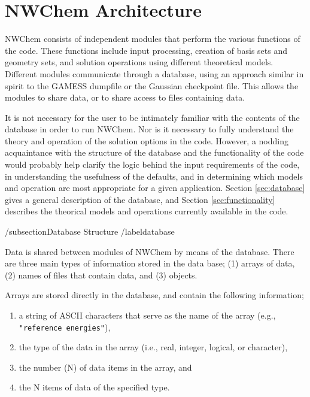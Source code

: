 \section{NWChem Architecture}
\label{sec:arch}

NWChem consists of independent modules that perform the various functions
of the code.  These functions include input processing, creation of basis
sets and geometry sets, and solution operations using different theoretical
models.  Different modules communicate through a database, using an approach
similar in spirit to the GAMESS dumpfile or the Gaussian checkpoint file.  
This allows the modules to share data, or to share access to files containing
data.

It is not necessary for the user to be intimately familiar with the contents
of the database in order to run NWChem.  Nor is it necessary to fully
understand the theory and operation of the solution options in the code.
However, a nodding acquaintance with the structure of the database and 
the functionality of the code would probably help clarify the logic behind
the input requirements of the code, in understanding the usefulness of the
defaults, and in determining which models and operation are most appropriate
for a given application.  Section \ref{sec:database} gives a general 
description of the database, and Section \ref{sec:functionality} describes 
the theorical models and operations currently available in the code.

/subsection{Database Structure}
/label{database}

Data is shared between modules of NWChem by means of the database.  There
are three main types of information stored in the data base; (1) arrays of
data, (2) names of files that contain data, and (3) objects.  

Arrays are stored directly in the database, and contain the following
information;

\begin{enumerate}
\item a string of ASCII characters that serve as the name of the array (e.g., 
      \verb+"reference energies"+),
\item the type of the data in the array (i.e., real, integer, logical, or character), 
\item the number (N) of data items in the array, and
\item the N items of data of the specified type.
\end{enumerate}

